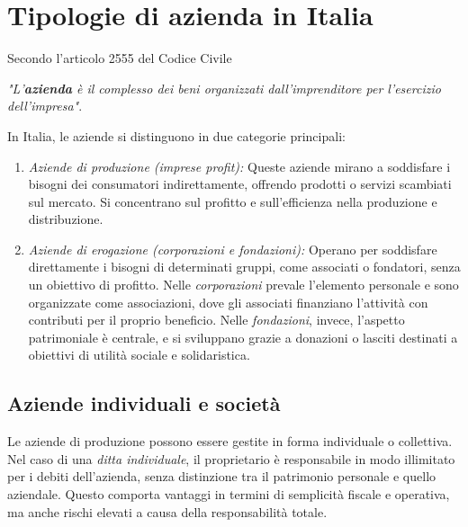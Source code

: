 \chapter{Tipologie di azienda in Italia}

\begin{redbar}
Secondo l'articolo 2555 del Codice Civile
\begin{center}
\textit{"L’\textbf{azienda} è il complesso dei beni organizzati dall’imprenditore per l’esercizio dell’impresa"}.    
\end{center}
\end{redbar}

In Italia, le aziende si distinguono in due categorie principali:
\begin{enumerate}
    \item \textit{Aziende di produzione (imprese profit):} Queste aziende mirano a soddisfare i bisogni dei consumatori indirettamente, offrendo prodotti o servizi scambiati sul mercato. Si concentrano sul profitto e sull'efficienza nella produzione e distribuzione.
    \item \textit{Aziende di erogazione (corporazioni e fondazioni):} Operano per soddisfare direttamente i bisogni di determinati gruppi, come associati o fondatori, senza un obiettivo di profitto. Nelle \textit{corporazioni} prevale l’elemento personale e sono organizzate come associazioni, dove gli associati finanziano l’attività con contributi per il proprio beneficio. Nelle \textit{fondazioni}, invece, l’aspetto patrimoniale è centrale, e si sviluppano grazie a donazioni o lasciti destinati a obiettivi di utilità sociale e solidaristica.
\end{enumerate}

\section{Aziende individuali e società}
Le aziende di produzione possono essere gestite in forma individuale o collettiva. Nel caso di una \textit{ditta individuale}, il proprietario è responsabile in modo illimitato per i debiti dell'azienda, senza distinzione tra il patrimonio personale e quello aziendale. Questo comporta vantaggi in termini di semplicità fiscale e operativa, ma anche rischi elevati a causa della responsabilità totale.

